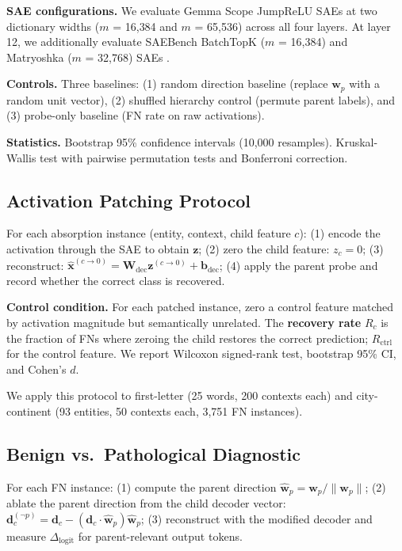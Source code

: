\documentclass{article}
\begin{document}
\textbf{SAE configurations.} We evaluate Gemma Scope JumpReLU SAEs \citep{lieberum2024gemma} at two dictionary widths ($m$ = 16{,}384 and $m$ = 65{,}536) across all four layers. At layer 12, we additionally evaluate SAEBench BatchTopK ($m$ = 16{,}384) and Matryoshka ($m$ = 32{,}768) SAEs \citep{karvonen2025saebench}.

\textbf{Controls.} Three baselines: (1) random direction baseline (replace $\mathbf{w}_p$ with a random unit vector), (2) shuffled hierarchy control (permute parent labels), and (3) probe-only baseline (FN rate on raw activations).

\textbf{Statistics.} Bootstrap 95\% confidence intervals (10{,}000 resamples). Kruskal-Wallis test with pairwise permutation tests and Bonferroni correction.

\subsection{Activation Patching Protocol}

For each absorption instance (entity, context, child feature $c$): (1) encode the activation through the SAE to obtain $\mathbf{z}$; (2) zero the child feature: $z_c = 0$; (3) reconstruct: $\hat{\mathbf{x}}^{(c \to 0)} = \mathbf{W}_{\text{dec}} \mathbf{z}^{(c \to 0)} + \mathbf{b}_{\text{dec}}$; (4) apply the parent probe and record whether the correct class is recovered.

\textbf{Control condition.} For each patched instance, zero a control feature matched by activation magnitude but semantically unrelated. The \textbf{recovery rate} $R_c$ is the fraction of FNs where zeroing the child restores the correct prediction; $R_{\text{ctrl}}$ for the control feature. We report Wilcoxon signed-rank test, bootstrap 95\% CI, and Cohen's $d$.

We apply this protocol to first-letter (25 words, 200 contexts each) and city-continent (93 entities, 50 contexts each, 3{,}751 FN instances).

\subsection{Benign vs.\ Pathological Diagnostic}

For each FN instance: (1) compute the parent direction $\hat{\mathbf{w}}_p = \mathbf{w}_p / \|\mathbf{w}_p\|$; (2) ablate the parent direction from the child decoder vector: $\mathbf{d}_c^{(\neg p)} = \mathbf{d}_c - (\mathbf{d}_c \cdot \hat{\mathbf{w}}_p)\hat{\mathbf{w}}_p$; (3) reconstruct with the modified decoder and measure $\Delta_{\text{logit}}$ for parent-relevant output tokens.
\end{document}
